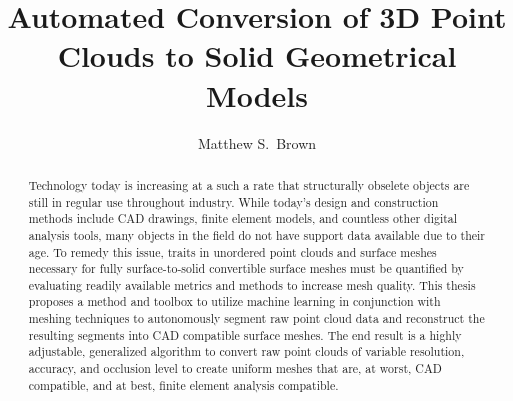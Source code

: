 \documentclass[12pt]{drexelthesis}
\title{Automated Conversion of 3D Point Clouds to Solid Geometrical Models}
\author{Matthew S.~Brown}
\begin{document}
\maketitle
\begin{preliminary}

\newpage

\setcounter{page}{2}

\date{} %

\begin{dedication}

\end{dedication}

\begin{acknowledgements}

\end{acknowledgements}


\mytableofcontents\newpage


\setlength{\baselineskip}{0.5\baselineskip}
\listoftables \newpage


\listoffigures \newpage
\setlength{\baselineskip}{2.0\baselineskip}

\begin{abstract}

Technology today is increasing at a such a rate that structurally obselete objects are still in regular use throughout industry. While today's design and construction methods include CAD drawings, finite element models, and countless other digital analysis tools, many objects in the field do not have support data available due to their age. To remedy this issue, traits in unordered point clouds and surface meshes necessary for fully surface-to-solid convertible surface meshes must be quantified by evaluating readily available metrics and methods to increase mesh quality. This thesis proposes a method and toolbox to utilize machine learning in conjunction with meshing techniques to autonomously segment raw point cloud data and reconstruct the resulting segments into CAD  compatible surface meshes. The end result is a highly adjustable, generalized algorithm to convert raw point clouds of variable resolution, accuracy, and occlusion level to create uniform meshes that are, at worst, CAD compatible, and at best, finite element analysis compatible.

\end{abstract}

\clearpage
\end{preliminary}
\thispagestyle{empty}
\newpage
\end{document}
